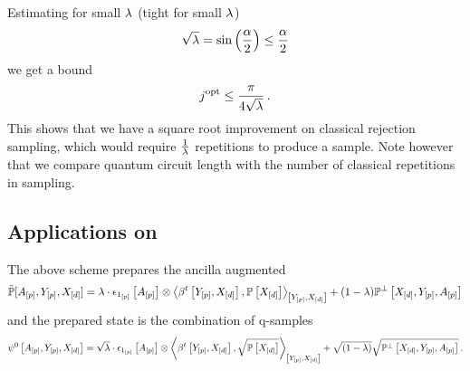 Estimating for small $\lambda$ (tight for small $\lambda$)
\begin{align*}
    \sqrt{\lambda} = \mathrm{sin}\left(\frac{\alpha}{2}\right)\leq \frac{\alpha}{2}
\end{align*}
we get a bound
\begin{align*}
    j^{\mathrm{opt}} \leq \frac{\pi}{4\sqrt{\lambda}} \, .
\end{align*}
This shows that we have a square root improvement on classical rejection sampling, which would require $\frac{1}{\lambda}$ repetitions to produce a sample.
Note however that we compare quantum circuit length with the number of classical repetitions in sampling.




\subsection{Applications on \CompActNets{}}

The above scheme prepares the ancilla augmented \ComputationActivationNetwork{}
\begin{align*}
    \secprobat{\avariables,\headvariables,\shortcatvariables}
    = \acceptanceprob \cdot \onehotmapofat{\onetuple{[\seldim]}}{\avariables}
    \otimes \contractionof{\bencodingofat{\sstat}{\headvariables,\shortcatvariables},\probwith}{\headvariables,\shortcatvariables}
    + (1-\acceptanceprob) \probofat{\perp}{\shortcatvariables,\headvariables,\avariables}
\end{align*}
and the prepared state is the combination of q-samples
\begin{align*}
    \qstateofat{0}{\avariables,\headvariables,\shortcatvariables}
    = \sqrt{\acceptanceprob} \cdot \onehotmapofat{\onetuple{[\seldim]}}{\avariables}
    \otimes \contractionof{\bencodingofat{\sstat}{\headvariables,\shortcatvariables},\sqrt{\probwith}}{\headvariables,\shortcatvariables}
    + \sqrt{(1-\acceptanceprob)} \sqrt{\probofat{\perp}{\shortcatvariables,\headvariables,\avariables}} \, .
\end{align*}

